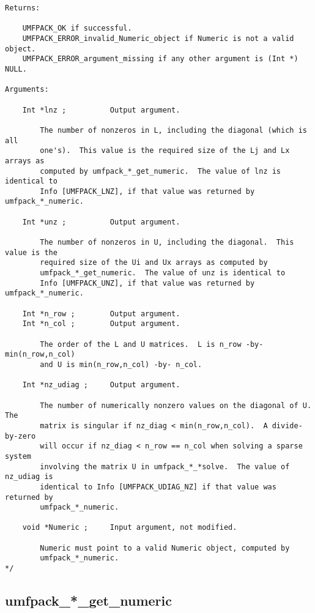 \documentclass[11pt]{article}
\begin{document}
{\begin{verbatim}
Returns:

    UMFPACK_OK if successful.
    UMFPACK_ERROR_invalid_Numeric_object if Numeric is not a valid object.
    UMFPACK_ERROR_argument_missing if any other argument is (Int *) NULL.

Arguments:

    Int *lnz ;          Output argument.

        The number of nonzeros in L, including the diagonal (which is all
        one's).  This value is the required size of the Lj and Lx arrays as
        computed by umfpack_*_get_numeric.  The value of lnz is identical to
        Info [UMFPACK_LNZ], if that value was returned by umfpack_*_numeric.

    Int *unz ;          Output argument.

        The number of nonzeros in U, including the diagonal.  This value is the
        required size of the Ui and Ux arrays as computed by
        umfpack_*_get_numeric.  The value of unz is identical to
        Info [UMFPACK_UNZ], if that value was returned by umfpack_*_numeric.

    Int *n_row ;        Output argument.
    Int *n_col ;        Output argument.

        The order of the L and U matrices.  L is n_row -by- min(n_row,n_col)
        and U is min(n_row,n_col) -by- n_col.

    Int *nz_udiag ;     Output argument.

        The number of numerically nonzero values on the diagonal of U.  The
        matrix is singular if nz_diag < min(n_row,n_col).  A divide-by-zero
        will occur if nz_diag < n_row == n_col when solving a sparse system
        involving the matrix U in umfpack_*_*solve.  The value of nz_udiag is
        identical to Info [UMFPACK_UDIAG_NZ] if that value was returned by
        umfpack_*_numeric.

    void *Numeric ;     Input argument, not modified.

        Numeric must point to a valid Numeric object, computed by
        umfpack_*_numeric.
*/
\end{verbatim}
}

\newpage
\subsection{umfpack\_*\_get\_numeric}
\end{document}
